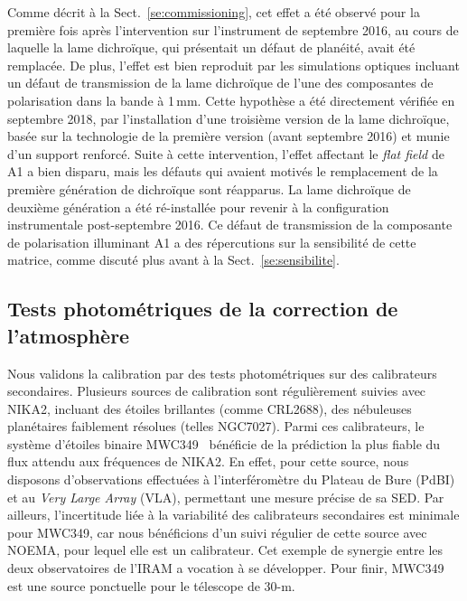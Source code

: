 Comme décrit à la Sect.~\ref{se:commissioning}, cet effet a été
observé pour la première fois après l'intervention sur l'instrument de
septembre 2016, au cours de laquelle la lame dichroïque, qui
présentait un défaut de planéité, avait été remplacée. De plus,
l'effet est bien reproduit par les simulations optiques incluant
un défaut de transmission de la lame dichroïque de l'une des composantes de
polarisation dans la bande à 1\,mm. Cette hypothèse a été directement
vérifiée en septembre 2018, par l'installation d'une troisième version
de la lame dichroïque, basée sur la technologie de la première version
(avant septembre 2016) et munie d'un support renforcé. Suite à cette
intervention, l'effet affectant le \emph{flat field} de A1 a bien
disparu, mais les défauts qui avaient motivés le remplacement de la
première génération de dichroïque sont réapparus. La lame dichroïque
de deuxième génération a été ré-installée pour revenir à la
configuration instrumentale post-septembre 2016. Ce défaut
de transmission de la composante de polarisation illuminant A1 a des
répercutions sur la sensibilité de cette matrice, comme discuté plus
avant à la Sect.~\ref{se:sensibilite}.      


\subsection{Tests photométriques de la correction de l'atmosphère}
\label{se:corrected_skydip}

Nous validons la calibration par des tests photométriques sur des
calibrateurs secondaires. Plusieurs sources de calibration sont
régulièrement suivies avec NIKA2, incluant des étoiles brillantes
(comme CRL2688), des nébuleuses planétaires faiblement résolues
(telles NGC7027). Parmi ces calibrateurs, le système d'étoiles binaire
MWC349~\citep{Tafoya2004} bénéficie de la prédiction la plus fiable du
flux attendu aux fréquences de NIKA2. En effet, pour cette source,
nous disposons d'observations effectuées à l'interféromètre du Plateau
de Bure (PdBI) et au \emph{Very Large Array} (VLA), permettant une
mesure précise de sa SED. Par ailleurs, l'incertitude liée à la
variabilité des calibrateurs secondaires est minimale pour MWC349,
car nous bénéficions d'un suivi régulier de cette source avec NOEMA,
pour lequel elle est un calibrateur. Cet exemple de synergie entre les
deux observatoires de l'IRAM a vocation à se développer. Pour finir,
MWC349 est une source ponctuelle pour le télescope de 30-m.

